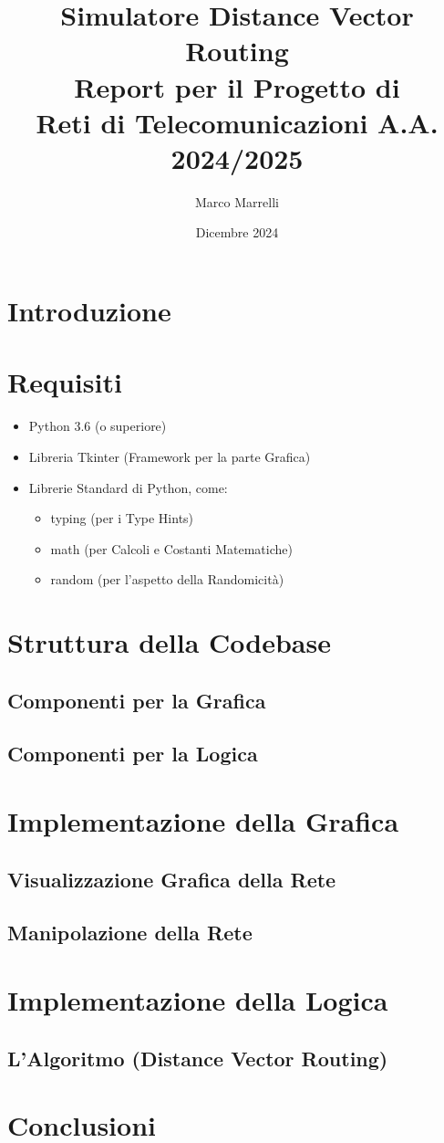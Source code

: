 \documentclass[a4paper,12pt]{report}
\title{Simulatore Distance Vector Routing\\Report per il Progetto di\\Reti di Telecomunicazioni A.A. 2024/2025}
\author{Marco Marrelli}
\date{Dicembre 2024}
\begin{document}
\maketitle

\renewcommand{\contentsname}{Indice}
\tableofcontents{}

\section{Introduzione}

\section{Requisiti}
\begin{itemize}
    \item Python 3.6 (o superiore)
    \item Libreria Tkinter (Framework per la parte Grafica)
    \item Librerie Standard di Python, come:
    \begin{itemize}
        \item typing (per i Type Hints)
        \item math (per Calcoli e Costanti Matematiche)
        \item random (per l'aspetto della Randomicità)
    \end{itemize}
\end{itemize}

\section{Struttura della Codebase}
\subsection{Componenti per la Grafica}
\subsection{Componenti per la Logica}

\section{Implementazione della Grafica}
\subsection{Visualizzazione Grafica della Rete}
\subsection{Manipolazione della Rete}

\section{Implementazione della Logica}
\subsection{L'Algoritmo (Distance Vector Routing)}

\section{Conclusioni}
\end{document}
